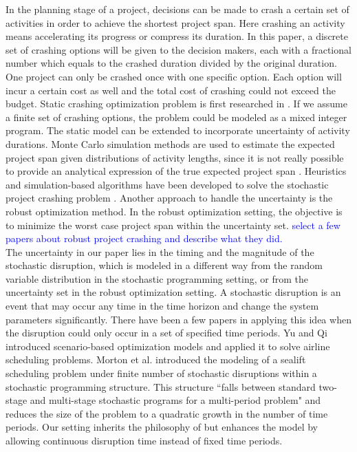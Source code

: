 \documentclass[11pt]{article}
\begin{document}
	In the planning stage of a project, decisions can be made to crash a certain set of activities in order to achieve the shortest project span. Here crashing an activity means accelerating its progress or compress its duration. In this paper, a discrete set of crashing options will be given to the decision makers, each with a fractional number which equals to the crashed duration divided by the original duration. One project can only be crashed once with one specific option. Each option will incur a certain cost as well and the total cost of crashing could not exceed the budget. Static crashing optimization problem is first researched in \cite{fulkerson1961network, kelley1961criticalpath}. If we assume a finite set of crashing options, the problem could be modeled as a mixed integer program. The static model can be extended to incorporate uncertainty of activity durations. Monte Carlo simulation methods are used to estimate the expected project span given distributions of activity lengths, since it is not really possible to provide an analytical expression of the true expected project span \cite{burt1971conditional,van1963letter}. Heuristics and simulation-based algorithms have been developed to solve the stochastic project crashing problem \cite{aghaie2009ant,ke2014genetic,kim2007heuristic}. Another approach to handle the uncertainty is the robust optimization method. In the robust optimization setting, the objective is to minimize the worst case project span within the uncertainty set. \textcolor{blue}{select a few papers about robust project crashing and describe what they did.}\\
	\newline
	The uncertainty in our paper lies in the timing and the magnitude of the stochastic disruption, which is modeled in a different way from the random variable distribution in the stochastic programming setting, or from the uncertainty set in the robust optimization setting. A stochastic disruption is an event that may occur any time in the time horizon and change the system parameters significantly. There have been a few papers in applying this idea when the disruption could only occur in a set of specified time periods. Yu and Qi \cite{yu2004disruptionmgt} introduced scenario-based optimization models and applied it to solve airline scheduling problems. Morton et al. \cite{morton2009sealift} introduced the modeling of a sealift scheduling problem under finite number of stochastic disruptions within a stochastic programming structure. This structure ``falls between standard two-stage and multi-stage stochastic programs for a multi-period problem" and reduces the size of the problem to a quadratic growth in the number of time periods. Our setting inherits the philosophy of \cite{morton2009sealift} but enhances the model by allowing continuous disruption time instead of fixed time periods.\\
\end{document}
